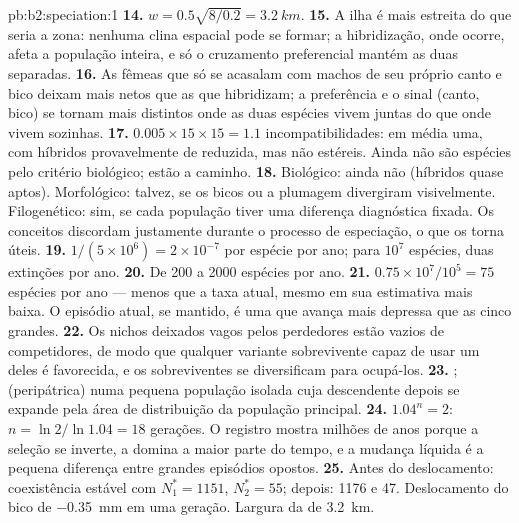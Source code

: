 \begin{solution}{pb:b2:speciation:1}
\textbf{14.} $w = 0.5\sqrt{8/0.2} = \qty{3.2}{km}$.
\textbf{15.} A ilha é mais estreita do que seria a zona: nenhuma clina
espacial pode se formar; a hibridização, onde ocorre, afeta a população
inteira, e só o cruzamento preferencial mantém as duas
separadas.
\textbf{16.} As fêmeas que só se acasalam com machos de seu próprio
canto e bico deixam mais netos que as que hibridizam; a preferência e o
sinal (canto, bico) se tornam mais distintos onde as duas espécies vivem
juntas do que onde vivem sozinhas.
\textbf{17.} $0.005\times 15\times 15 = 1.1$ incompatibilidades: em
média uma, com híbridos provavelmente de  reduzida, mas não
estéreis. Ainda não são espécies pelo critério biológico; estão a
caminho.
\textbf{18.} Biológico: ainda não (híbridos quase aptos).
Morfológico: talvez, se os bicos ou a plumagem divergiram
visivelmente. Filogenético: sim, se cada população tiver uma diferença
diagnóstica fixada. Os conceitos discordam justamente durante o
processo de especiação, o que os torna úteis.
\textbf{19.} $1/(5\times 10^{6}) = 2\times 10^{-7}$ por espécie por
ano; para $10^{7}$ espécies, duas extinções por ano.
\textbf{20.} De 200 a 2000 espécies por ano.
\textbf{21.} $0.75\times 10^{7}/10^{5} = 75$ espécies por ano --- menos
que a taxa atual, mesmo em sua estimativa mais baixa. O episódio atual,
se mantido, é uma  que avança mais depressa que as cinco
grandes.
\textbf{22.} Os nichos deixados vagos pelos perdedores estão vazios de
competidores, de modo que qualquer variante sobrevivente capaz de usar
um deles é favorecida, e os sobreviventes se diversificam para ocupá-los.
\textbf{23.} ;  (peripátrica)
numa pequena população isolada cuja descendente depois se expande pela
área de distribuição da população principal.
\textbf{24.} $1.04^{n} = 2$: $n = \ln 2/\ln 1.04 = 18$ gerações.
O registro mostra milhões de anos porque a seleção se inverte, a  domina a maior parte do tempo, e a mudança líquida é a
pequena diferença entre grandes episódios opostos.
\textbf{25.} Antes do deslocamento: coexistência estável com $N_1^{*} =
1151$, $N_2^{*} = 55$; depois: 1176 e 47. Deslocamento do bico de
\qty{-0.35}{mm} em uma geração. Largura da  de \qty{3.2}{km}.
\end{solution}
